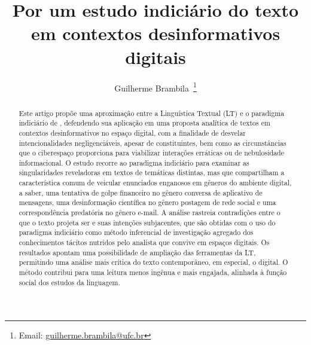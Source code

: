 \documentclass[portuguese]{textolivre}
\title{Por um estudo indiciário do texto em contextos desinformativos digitais}
\author[1]{Guilherme Brambila~\orcid{0000-0001-7978-5020}\thanks{Email: \href{mailto:guilherme.brambila@ufc.br}{guilherme.brambila@ufc.br}}}
\affil[1]{Universidade Federal do Ceará, Fortaleza, CE, Brasil.}
\begin{document}
\maketitle

\begin{polyabstract}
\begin{abstract}
Este artigo propõe uma aproximação entre a Linguística Textual (LT) e o paradigma indiciário de \textcite{ginzburg1986mitos,ginzburg2007fio}, defendendo sua aplicação em uma proposta analítica de textos em contextos desinformativos no espaço digital, com a finalidade de desvelar intencionalidades negligenciáveis, apesar de constituintes, bem como as circunstâncias que o ciberespaço proporciona para viabilizar interações erráticas ou de nebulosidade informacional. O estudo recorre ao paradigma indiciário para examinar as singularidades reveladoras \cite{abaurre2008torno} em textos de temáticas distintas, mas que compartilham a característica comum de veicular enunciados enganosos em gêneros do ambiente digital, a saber, uma tentativa de golpe financeiro no gênero conversa de aplicativo de mensagens, uma desinformação científica no gênero postagem de rede social e uma correspondência predatória no gênero e-mail. A análise rastreia contradições entre o que o texto projeta ser e suas intenções subjacentes, que são obtidas com o uso do paradigma indiciário como método inferencial de investigação agregado dos conhecimentos tácitos nutridos pelo analista que convive em espaços digitais. Os resultados apontam uma possibilidade de ampliação das ferramentas da LT, permitindo uma análise mais crítica do texto contemporâneo, em especial, o digital. O método contribui para uma leitura menos ingênua e mais engajada, alinhada à função social dos estudos da linguagem.

\end{abstract}


\end{polyabstract}
\end{document}
